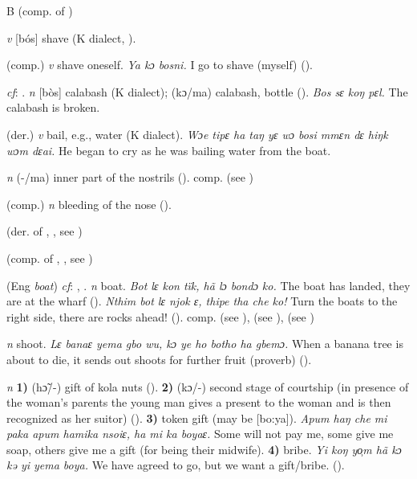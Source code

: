 \begin{letter}{B}
 (comp. of ) 

 \textit{v} [bós] shave (K dialect, \citealt{Pichl1967}). 

 (comp.) \textit{v} shave oneself. \textit{Ya kɔ bosni.} I go to shave (myself) (\citealt{Pichl1967}). 

 \textit{cf}: . \textit{n} [bòs] calabash (K dialect); (kɔ/ma) calabash, bottle (\citealt{Pichl1967}). \textit{Bos sɛ koŋ pɛl.} The calabash is broken.

 (der.) \textit{v} bail, e.g., water (K dialect). \textit{Wɔe tipɛ ha taŋ yɛ wɔ bosi mmɛn dɛ hiŋk wɔm dɛai.} He began to cry as he was bailing water from the boat.

 \textit{n} (-/ma) inner part of the nostrils (\citealt{Pichl1967}). comp.  (see ) 

 (comp.) \textit{n} bleeding of the nose (\citealt{Pichl1967}). 

 (der. of , , see ) 

 (comp. of , , see ) 

 (Eng \textit{boat}) \textit{cf}: , . \textit{n} boat. \textit{Bot lɛ kon tïk, hã lɔ bondɔ ko.} The boat has landed, they are at the wharf (\citealt{Pichl1967}). \textit{Nthim bot lɛ njok ɛ, thipe tha che ko!} Turn the boats to the right side, there are rocks ahead! (\citealt{Pichl1967}). comp.  (see ),  (see ),  (see ) 

 \textit{n} shoot. \textit{Lɛ banaɛ yema gbo wu, kɔ ye ho botho ha gbemɔ.} When a banana tree is about to die, it sends out shoots for further fruit (proverb) (\citealt{TISLL1979}). 

 \textit{n} \textbf{1)} (hɔ̃/-) gift of kola nuts (\citealt{Pichl1967}). \textbf{2)} (kɔ/-) second stage of courtship (in presence of the woman's parents the young man gives a present to the woman and is then recognized as her suitor) (\citealt{Pichl1967}). \textbf{3)} token gift (may be [bo:ya]). \textit{Apum haŋ che mi paka apum hamika nsoiɛ, ha mi ka boyaɛ.} Some will not pay me, some give me soap, others give me a gift (for being their midwife). \textbf{4)} bribe. \textit{Yi koŋ yo̹m hã kɔ kə yi yema boya.} We have agreed to go, but we want a gift/bribe. (\citealt{Pichl1967}).


\end{letter}
